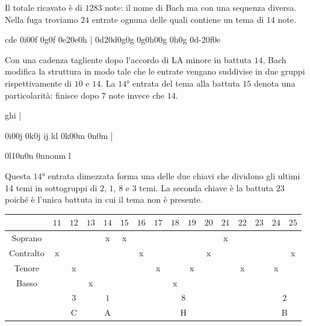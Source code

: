 \documentclass[12pt]{article}
\begin{document}
Il totale ricavato è di $1283$ note: il nome di Bach ma con una sequenza diversa.
Nella fuga troviamo $24$ entrate ognuna delle quali contiene un tema di $14$ note.


\nobarnumbers %
\startextract %
\Notes\ds\Tqbu cde \en
\notesp\ibu0i0\qbp0f\en
\Notes{}\qb0g\qb0f\en
\Notes\ibu0e2\qb0e\tqu0h\en
\bar
\Notes\ibu0d2\qb0d\islurd0g\tqu0g\en
\Notes\tslur0g\ibu0h0\qb0g\en
\notes{}\qb0h\tqh0g\en
\Notes\ibbu0d{-2}\qb0f\qb0e\en
\Notes\ds\ds\qs\en
\endextract

Con una cadenza tagliente dopo l’accordo di LA minore in battuta $14$, Bach modifica la struttura in
modo tale che le entrate vengano suddivise in due gruppi rispettivamente di $10$ e $14$.
La $14$° entrata del tema alla battuta $15$ denota una particolarità: finisce dopo $7$ note invece che $14$.


\nobarnumbers
\startextract
\Notes \qp \qp \ds \Tqbu ghi \en
\bar

\notesp\ibl0i0\qbp0j\en
\Notes{}\qb0k\qb0j\en
\Notes \Dqbl ij \en
\Notes \Dqbl kl \en
\notesp\ibl0k0\qbp0m\en
\Notes{}\qb0n\qb0m\en
\bar

\Notes \ibl0l1\isluru0n\tqb0n\en
\Notes \tslur0n\Qqbbl nonm \en
\Notes  \cl l \ds \en
\endextract

Questa $14$° entrata dimezzata forma una delle due chiavi che dividono gli ultimi 14 temi in
sottogruppi di $2$, $1$, $8$ e $3$ temi.
La seconda chiave è la battuta $23$ poiché è l’unica battuta in cui il tema non è presente.

\begin{center}
\begin{tabular}{|c|c|c|c|c|c|c|c|c|c|c|c|c|c|c|c|}
  \hline
  & $11$ & $12$ & $13$ & $14$ & $15$ & $16$ & $17$ & $18$ & $19$ & $20$ & $21$ & $22$ & $23$ & $24$ & $25$\\
  \hline
  Soprano & & & & x & x & & & & & & x & & & &\\ 
  \hline
  Contralto & x & & & & & x & & & & x & & & & & x\\  
  \hline
  Tenore & & x & & & & & x & & x & & & x & & x &\\ 
  \hline
  Basso & & & x & & & & & x & & & & & & &\\ 
  \hline
  & \multicolumn{3}{c|}{$3$} & $1$ & \multicolumn{8}{c|}{$8$} & & \multicolumn{2}{c|}{$2$}\\
  \hline
  & \multicolumn{3}{c|}{C} & A & \multicolumn{8}{c|}{H} & & \multicolumn{2}{c|}{B}\\
  \hline
\end{tabular}
\end{center}
\end{document}
